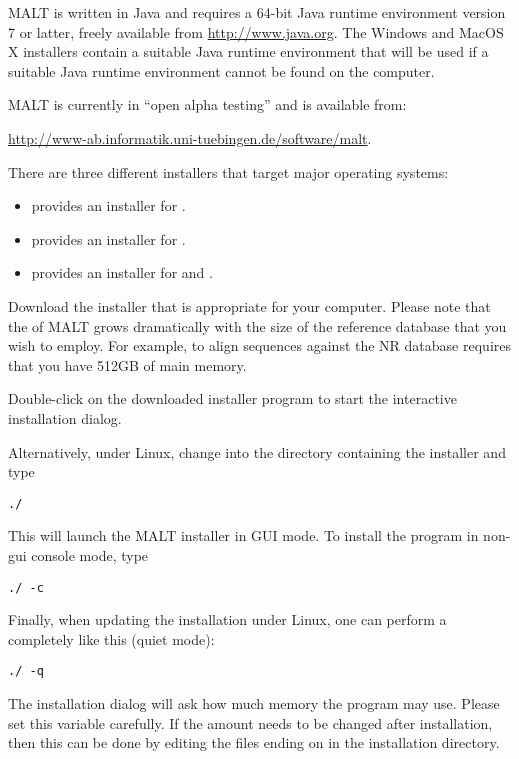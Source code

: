 \documentclass[11pt]{article}
\newcommand\MALT{{\sf MALT}\xspace}
\begin{document}
\MALT is written in Java and requires a 64-bit Java runtime environment
version 7 or latter, freely available from \url{http://www.java.org}.
The Windows and MacOS X installers contain a suitable Java runtime environment that will be used if
a suitable Java runtime environment cannot be found on the computer.

\MALT is currently in ``open alpha testing'' and is available from:

\url{http://www-ab.informatik.uni-tuebingen.de/software/malt}.

There are three different installers that target major operating systems:
\begin{itemize}
\item {} provides an installer  for .
\item {} provides an installer for .
\item {} provides an installer for  and  .
\end{itemize}

Download the installer that is appropriate for your computer. Please note that the 
of \MALT grows dramatically with the size of the reference database that you wish to employ.
For example, to align sequences against the NR database requires that you have 512GB of main memory.

Double-click on the downloaded installer program  to start the interactive installation dialog.

Alternatively, under Linux, change into the directory containing the installer and type

{\tt ./}

This will launch the \MALT installer in GUI mode. To install the program in non-gui console mode,
type

{\tt ./ -c}

Finally, when updating the installation under Linux, one can perform a completely
 like this (quiet mode):

{\tt ./ -q}

The installation dialog will ask how much memory the program may use. Please set this variable carefully.
If the amount needs to be changed after installation, then this can be done by editing the files
ending on  in the installation directory.
\end{document}
